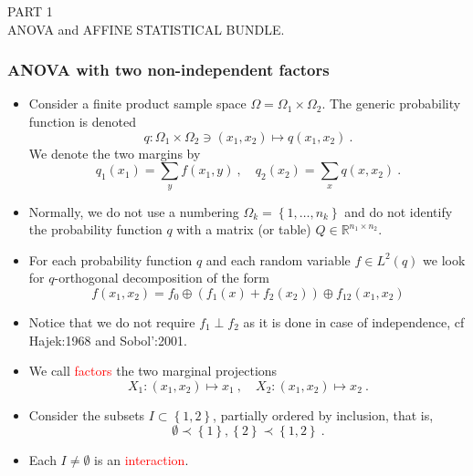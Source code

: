 \documentclass[xcolor=svgnames]{beamer}
\newcommand{\reals}{\mathbb{R}}
\newcommand{\rosso}[1]{\textcolor{red}{#1}}
\newcommand{\set}[1]{\left\{#1\right\}}
\renewcommand{\emph}{\rosso}
\begin{document}
\begin{frame}[plain]

\huge PART 1 \\ ANOVA and AFFINE STATISTICAL BUNDLE.
    
\end{frame}

    \begin{frame}\small\frametitle{ANOVA with two non-independent factors}

    \begin{itemize}
    \item Consider a finite product sample space $\Omega = \Omega_1 \times \Omega_2$. The generic probability function is denoted
    \begin{equation*}
       q \colon  \Omega_1 \times \Omega _2 \ni (x_1,x_2) \mapsto q(x_1,x_2) \ . 
    \end{equation*}
    We denote the two margins by 
    \begin{equation*}
    q_1(x_1) = \sum_y f(x_1,y) \ , \quad q_2(x_2) = \sum_x q(x,x_2) \ .
    \end{equation*}
    \item Normally, we do not use a numbering $\Omega_k = \set{1,\dots,n_k}$ and do not identify the probability function $q$ with a matrix (or table) $Q \in \reals^{n_1 \times n_2}$.
    \item For each probability function $q$ and each random variable $f \in L^2(q)$ we look for $q$-orthogonal decomposition of the form
    \begin{equation*}
        f(x_1,x_2) = f_0 \oplus (f_1(x) + f_2(x_2)) \oplus f_{12}(x_1,x_2)
    \end{equation*}
    \item Notice that we do not require $f_1 \perp f_2$ as it is done in case of independence, cf Hajek:1968 and Sobol':2001.
    \item We call \emph{factors} the two marginal projections
\begin{equation*}
    X_1 \colon (x_1,x_2) \mapsto x_1 \ , \quad X_2 \colon (x_1,x_2) \mapsto x_2 \ .  
    \end{equation*}
  \item Consider the subsets $I \subset \set{1,2}$, partially ordered by inclusion, that is, 
\begin{equation*}\emptyset \prec \set{1},\set{2} \prec \set{1,2} \ .
\end{equation*}
\item  Each $I \neq \emptyset$ is an \emph{interaction}. 

\end{itemize}
\end{frame}
\end{document}
